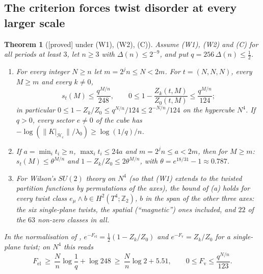 \documentclass[11pt,a4paper]{article}
\theoremstyle{plain}
\newtheorem{theorem}{Theorem}[section]
\theoremstyle{definition}
\theoremstyle{remark}
\numberwithin{equation}{section}
\newcommand{\Z}{\mathbb{Z}}
\newcommand{\st}[1]{\textsf{[#1]}}
\begin{document}
\subsection{The criterion forces twist disorder at every larger scale}\label{subsec:T2}
\begin{theorem}[\st{proved} under (W1), (W2), (C)]\label{thm:twistall}
Assume (W1), (W2) and (C) for all periods at least $3$, let $n\ge3$ with $\Delta(n)\le2^{-9}$, and put $q=256\,\Delta(n)\le\frac12$.
\begin{enumerate}
\item[(a)] For every integer $N\ge n$ let $m=2^jn\le N<2m$. For $t=(N,N,N)$, every $M\ge m$ and every $k\ne0$,
\[
s_t(M)\le\frac{q^{M/n}}{248},\qquad 0\le1-\frac{Z_k(t,M)}{Z_0(t,M)}\le\frac{q^{M/n}}{124};
\]
in particular $0\le1-Z_k/Z_0\le q^{N/n}/124\le2^{-N/n}/124$ on the hypercube $N^4$. If $q>0$, every sector $e\ne0$ of the cube has $-\log(\|K|_{\mathcal H_e}\|/\lambda_0)\ge\log(1/q)/n$.
\item[(b)] If $a=\min_it_i\ge n$, $\max_it_i\le24a$ and $m=2^jn\le a<2m$, then for $M\ge m$: $s_t(M)\le\theta^{M/n}$ and $1-Z_k/Z_0\le2\theta^{M/n}$, with $\theta=e^{18/31}-1\approx0.787$.
\item[(c)] For Wilson's $SU(2)$ theory on $N^4$ (so that (W1) extends to the twisted partition functions by permutations of the axes), the bound of (a) holds for every twist class $e_\mu\wedge b\in H^2(T^4;\Z_2)$, $b$ in the span of the other three axes: the six single-plane twists, the spatial (``magnetic'') ones included, and $22$ of the $63$ non-zero classes in all.
\end{enumerate}
In the normalisation of \cite{TY85,KT02}, $e^{-F_{\mathrm{el}}}=\frac12(1-Z_k/Z_0)$ and $e^{-F_{\mathrm v}}=Z_k/Z_0$ for a single-plane twist; on $N^4$ this reads
\[
F_{\mathrm{el}}\ \ge\ \frac Nn\log\frac1q+\log248\ \ge\ \frac Nn\log2+5.51,\qquad 0\le F_{\mathrm v}\le\frac{q^{N/n}}{123}.
\]
\end{theorem}
\end{document}
